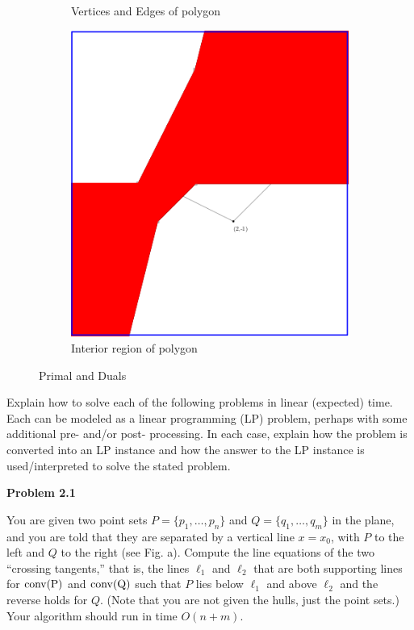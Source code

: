 \documentclass[11pt]{article}
\begin{document}
\begin{figure}[h!]
\begin{subfigure}{0.45\textwidth}
    \caption{Vertices and Edges of polygon}
    \label{fig:three sin x}
\end{subfigure}
\hfill
\begin{subfigure}{0.45\textwidth}
    \centering
    \includegraphics[width=\textwidth]{p1_interior.png}
    \caption{Interior region of polygon}
    \label{fig:five over x}
\end{subfigure}
   \caption{Primal and Duals}
   \label{fig:three graphs}
\end{figure}









Explain how to solve each of the following problems in linear (expected) time.
Each can be modeled as a linear programming (LP) problem, perhaps with some
additional pre- and/or post- processing. In each case, explain how the problem
is converted into an LP instance and how the answer to the LP instance is
used/interpreted to solve the stated problem.



\Large{\textbf{Problem 2.1}}

You are given two point sets $P = \{p_1,\ldots,p_n\}$ and $Q =
\{q_1,\ldots,q_m\}$ in the plane, and you are told that they are
separated by a vertical line $x = x_0$, with $P$ to the left and $Q$ to
the right (see Fig. a). Compute the line equations of the two
``crossing tangents,'' that is, the lines $\ell_1$ and $\ell_2$ that are
both supporting lines for $\rm{conv}(P)$ and $\rm{conv}(Q)$ such that
$P$ lies below $\ell_1$ and above $\ell_2$ and the reverse holds for
$Q$. (Note that you are not given the hulls, just the point sets.) Your
algorithm should run in time $O(n + m)$.
\end{document}
